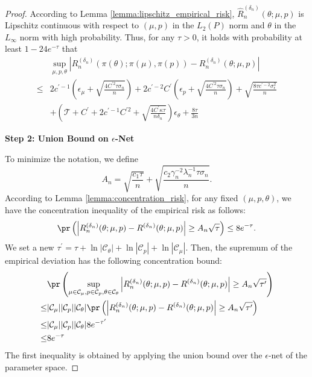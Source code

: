 \begin{proof}
\noindent 
According to Lemma \ref{lemma:lipschitz_empirical_risk}, $\widehat R_n^{(\delta_n)}(\theta; \mu, p)$ is Lipschitz continuous with respect to $(\mu, p)$ in the $L_2(P)$ norm and $\theta$ in the $L_\infty$ norm with high probability. Thus, for any $\tau > 0$, it holds with probability at least $1-24e^{-\tau}$ that
\begin{align*}
    &\sup_{\mu, p, \theta} \left| R_n^{(\delta_n)}(\pi(\theta); \pi(\mu), \pi(p)) - R_n^{(\delta_n)}(\theta; \mu, p) \right|\\
    \leq & 2c^{\prime-1}\left(\epsilon_\mu + \sqrt{\frac{4C^{\prime2}\tau\sigma_n}{n}}\right)  + 2c^{\prime-2}C^{\prime}\left(\epsilon_p+\sqrt{\frac{4C^{\prime2}\tau\sigma_n}{n}}\right)  + \sqrt{\frac{8\tau c^{\prime-2} \sigma_\epsilon^2}{n}}\\
& + \left(\mathcal{T}+C^\prime+2c^{\prime-1}C^{\prime2}+\sqrt{\frac{4C^\prime \kappa \tau}{n\delta_n}}\right)\epsilon_\theta + \frac{8\tau}{3n}
\end{align*}

\noindent\textbf{Step 2: Union Bound on $\epsilon$-Net}


\noindent To minimize the notation, we define
$$A_n = \sqrt{\frac{c_1\tau}{n}}+
    \sqrt{\frac{ c_2\gamma_n^{-2}\lambda_n^{-1}\tau\sigma_n}{n}} .$$
According to Lemma \ref{lemma:concentration_risk}, for any fixed $(\mu,p,\theta)$, we have the concentration inequality of the empirical risk as follows:
$$\pr\left(\left|R_n^{({\delta_n})}(\theta;\mu, p)-R^{({\delta_n})}(\theta;\mu, p)\right|\geq A_n\sqrt{\tau}\right)\leq 8e^{-\tau}.$$
We set a new $\tau^\prime =  \tau + \ln|\mathcal{C}_\theta| + \ln|\mathcal{C}_p| + \ln|\mathcal{C}_\mu|$. Then, the supremum of the empirical deviation has the following concentration bound:
\begin{align*}
&\pr\left(\sup_{\mu\in\mathcal{C}_\mu, p\in \mathcal{C}_p,\theta\in \mathcal{C}_\theta}\left|R_n^{({\delta_n})}(\theta;\mu, p)-R^{({\delta_n})}(\theta;\mu, p)\right|\geq A_n\sqrt{\tau^\prime}\right)\\
    \leq &|\mathcal{C}_\mu||\mathcal{C}_p||\mathcal{C}_\theta| \pr\left(\left|R_n^{({\delta_n})}(\theta;\mu, p)-R^{({\delta_n})}(\theta;\mu, p)\right|\geq A_n\sqrt{\tau^\prime}\right)\\
    \leq & |\mathcal{C}_\mu||\mathcal{C}_p||\mathcal{C}_\theta| 8 e^{-\tau^\prime}\\
    \leq & 8 e^{-\tau}
\end{align*}
The first inequality is obtained by applying the union bound over the $\epsilon$-net of the parameter space.


\end{proof}

